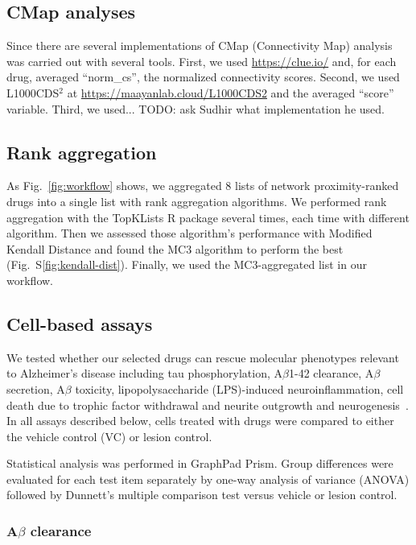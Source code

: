 \documentclass[letterpaper]{article}
\begin{document}
\subsection{CMap analyses}

Since there are several implementations of CMap (Connectivity Map) analysis was carried out with several tools.  First, we used
\url{https://clue.io/} \citep{Lamb2006} and, for each drug, averaged
``norm\_cs'',
the normalized connectivity scores.  Second, we used L1000CDS$^2$ at
\url{https://maayanlab.cloud/L1000CDS2} and the averaged ``score'' variable.
Third, we used... TODO: ask Sudhir what implementation he used.

\subsection{Rank aggregation}

As Fig.~\ref{fig:workflow} shows, we aggregated 8 lists of network
proximity-ranked drugs into a single list with rank aggregation algorithms.
We performed rank aggregation with the TopKLists R package
several times, each time with different algorithm.  Then we assessed those
algorithm's performance with Modified Kendall Distance and found the MC3
algorithm to perform the best (Fig.~S\ref{fig:kendall-dist}).  Finally, we
used the MC3-aggregated list in our workflow.

\subsection{Cell-based assays}

We tested whether our selected drugs can rescue molecular phenotypes relevant
to Alzheimer's disease including tau phosphorylation, A$\beta$1-42 clearance,
A$\beta$ secretion, A$\beta$ toxicity, lipopolysaccharide (LPS)-induced
neuroinflammation, cell death due to trophic factor withdrawal and neurite
outgrowth and neurogenesis~\citep{Varma2020,Desai2022a}. In all assays
described below, cells treated with drugs were compared to either the vehicle
control (VC) or lesion control.

Statistical analysis was performed in GraphPad Prism. Group differences
were evaluated for each test item separately by one-way analysis of variance
(ANOVA) followed by Dunnett's multiple comparison test versus vehicle or
lesion control.

\subsubsection{A$\beta$ clearance}
\end{document}
